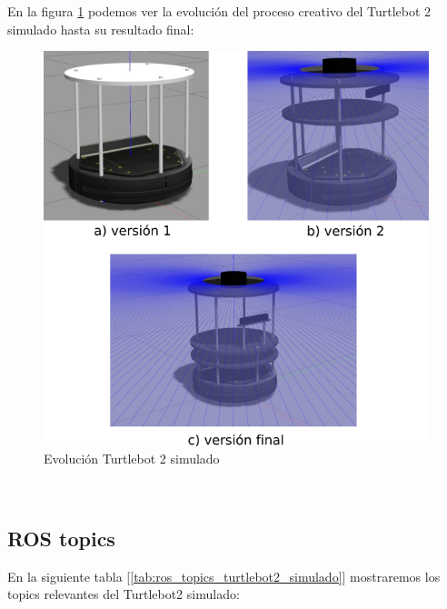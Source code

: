 En la figura \ref{fig:evolucion_turtlebot2_sim} podemos ver la evolución del proceso creativo del Turtlebot 2 simulado hasta su resultado final:\\
\begin{figure} [H]
  \begin{center}
    \includegraphics[width=12.5cm]{imagenes/cap4/creacion-turtlebot2-sim.png}
  \end{center}
  \caption[Evolución Turtlebot 2 simulado]{Evolución Turtlebot 2 simulado}
  \label{fig:evolucion_turtlebot2_sim}
\end{figure}\


\subsection{ROS topics}
\label{subsec:ros_topics}

En la siguiente tabla [\ref{tab:ros_topics_turtlebot2_simulado}] mostraremos los topics relevantes del Turtlebot2 simulado:

